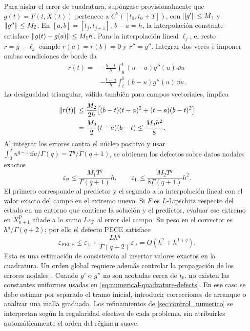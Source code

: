 Para aislar el error de cuadratura, supóngase provisionalmente que
\(g(t)=F(t,X(t))\) pertenece a \(C^2([t_0,t_0+T])\), con
\(\left\lVert g'\right\rVert\leq M_1\) y \(\left\lVert g''\right\rVert\leq M_2\). En
\([a,b]=[t_j,t_{j+1}]\), \(b-a=h\), la interpolación constante satisface
\(\left\lVert g(t)-g(a)\right\rVert\leq M_1h\). Para la interpolación lineal \(\ell_j\), el
resto \(r=g-\ell_j\) cumple \(r(a)=r(b)=0\) y \(r''=g''\). Integrar dos
veces e imponer ambas condiciones de borde da
\[
 \begin{aligned}
 r(t)={}&-\frac{b-t}{h}\int_a^t(u-a)g''(u)\,\dd u\\
        &-\frac{t-a}{h}\int_t^b(b-u)g''(u)\,\dd u.
 \end{aligned}
\]
La desigualdad triangular, válida también para campos vectoriales, implica
\[
 \begin{aligned}
 \left\lVert r(t)\right\rVert
 &\leq\frac{M_2}{2h}\bigl[(b-t)(t-a)^2+(t-a)(b-t)^2\bigr]\\
 &=\frac{M_2}{2}(t-a)(b-t)\leq\frac{M_2h^2}{8}.
 \end{aligned}
\]
Al integrar los errores contra el núcleo positivo y usar
\(\int_0^T u^{q-1}\,\dd u/\Gamma(q)=T^q/\Gamma(q+1)\), se obtienen los
defectos sobre datos nodales exactos
\begin{equation}
 \varepsilon_{\mathrm P}\leq\frac{M_1T^q}{\Gamma(q+1)}h,
 \qquad
 \varepsilon_{\mathrm L}\leq\frac{M_2T^q}{8\Gamma(q+1)}h^2.
 \label{eq:numerical-quadrature-defects}
\end{equation}
El primero corresponde al predictor y el segundo a la interpolación lineal
con el valor exacto del campo en el extremo nuevo. Si \(F\) es
\(L\)-Lipschitz respecto del estado en un entorno que contiene la solución y
el predictor, evaluar ese extremo en \(X_{n+1}^{\mathrm P}\) añade a lo sumo
\(L\varepsilon_{\mathrm P}\) al error del campo. Su peso en el corrector es
\(h^q/\Gamma(q+2)\); por ello el defecto PECE satisface
\begin{equation}
 \varepsilon_{\mathrm{PECE}}
 \leq \varepsilon_{\mathrm L}
       +\frac{Lh^q}{\Gamma(q+2)}\varepsilon_{\mathrm P}
 =O(h^2+h^{1+q}).
 \label{eq:numerical-pece-consistency}
\end{equation}
Esta es una estimación de consistencia al insertar valores exactos en la
cuadratura. Un orden global requiere además controlar la propagación de los
errores nodales \cite{DiethelmFordFreed2002}. Cuando \(g'\) o \(g''\) no son
acotadas cerca de \(t_0\), no existen las constantes uniformes usadas en
\cref{eq:numerical-quadrature-defects}. En ese caso se debe estimar por
separado el tramo inicial, introducir correcciones de arranque o analizar
una malla graduada. Los refinamientos de \cref{sec:control_numerico} se
interpretan según la regularidad efectiva de cada problema, sin atribuirles
automáticamente el orden del régimen suave.

